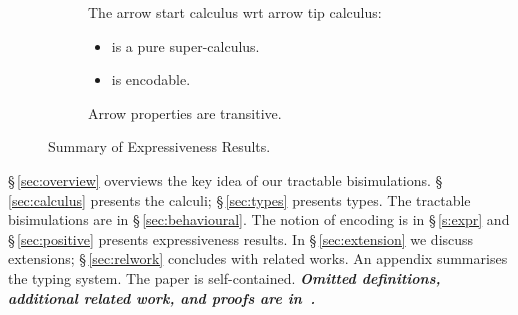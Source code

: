 \begin{figure}[t]
	\centering
	\begin{subfigure}[b]{0.45\linewidth}
		\centering
	\end{subfigure}
	\begin{subfigure}[b]{0.5\linewidth}
		\small
		The arrow start calculus wrt arrow tip calculus:
		\begin{itemize}
			\item	is a pure super-calculus.
			\item	is encodable.
		\end{itemize}
		Arrow properties are transitive.
	\end{subfigure}
	\caption{Summary of Expressiveness Results. \label{fig:express}}
\Hline
\end{figure}

\smallskip

\S\,\ref{sec:overview} overviews the key idea of our tractable bisimulations.
\noi \S\,\ref{sec:calculus} presents the calculi; 
\S\,\ref{sec:types} presents types.
The tractable bisimulations are in \S\,\ref{sec:behavioural}.
The notion of encoding is in \S\,\ref{s:expr} and
\S\,\ref{sec:positive} %
presents expressiveness results.
In \S\,\ref{sec:extension} we discuss extensions; 
\S\,\ref{sec:relwork} concludes with related works.
An appendix summarises the typing system. 
The paper is self-contained. 
{\bf\em Omitted definitions, additional related work, and  proofs 
are 
in~\cite{KouzapasPY15}.} 

